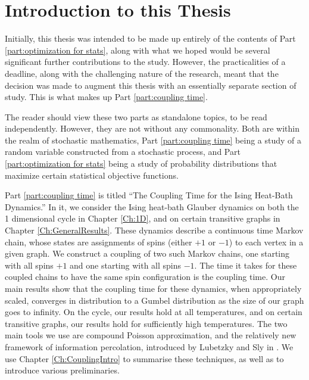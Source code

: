 \chapter{Introduction to this Thesis}
\label{Ch:ThesisIntro}


Initially, this thesis was intended to be made up entirely of the contents of Part \ref{part:optimization for stats}, along with what we hoped would be several significant further contributions to the study. However, the practicalities of a deadline, along with the challenging nature of the research, meant that the decision was made to augment this thesis with an essentially separate section of study. This is what makes up Part \ref{part:coupling time}.

The reader should view these two parts as standalone topics, to be read independently. However, they are not without any commonality. Both are within the realm of stochastic mathematics, Part \ref{part:coupling time} being a study of a random variable constructed from a stochastic process, and Part \ref{part:optimization for stats} being a study of probability distributions that maximize certain statistical objective functions. 


Part \ref{part:coupling time} is titled ``The Coupling Time for the Ising Heat-Bath Dynamics.'' In it, we consider the Ising heat-bath Glauber dynamics on both the 1 dimensional cycle in Chapter \ref{Ch:1D}, and on certain transitive graphs in Chapter \ref{Ch:GeneralResults}. These dynamics describe a continuous time Markov chain, whose states are assignments of spins (either $+1$ or $-1$) to each vertex in a given graph. We construct a coupling of two such Markov chains, one starting with all spins $+1$ and one starting with all spins $-1$. The time it takes for these coupled chains to have the same spin configuration is the coupling time.
Our main results show that the coupling time for these dynamics, when appropriately scaled, converges in distribution to a Gumbel distribution as the size of our graph goes to infinity. On the cycle, our results hold at all temperatures, and on certain transitive graphs, our results hold for sufficiently high temperatures. The two main tools we use are compound Poisson approximation, and the relatively new framework of information percolation, introduced by Lubetzky and Sly in \cite{Lubetzky2016-wd}. We use Chapter \ref{Ch:CouplingIntro} to summarise these techniques, as well as to introduce various preliminaries.

